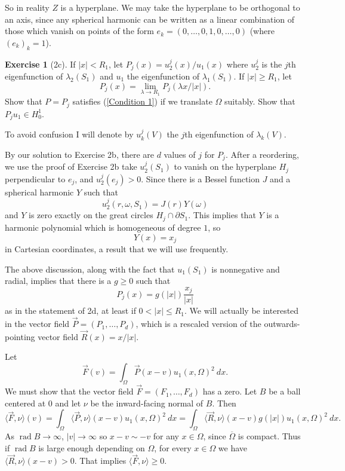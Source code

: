 \documentclass[10pt]{article}
\DeclareMathOperator{\rad}{rad}
\theoremstyle{definition}
\newtheorem{exer}{Exercise}
\begin{document}
So in reality $Z$ is a hyperplane.
We may take the hyperplane to be orthogonal to an axis, since any spherical harmonic can be written as a linear combination of those which vanish on points of the form $e_k = (0, \dots, 0, 1, 0, \dots, 0)$ (where $(e_k)_k = 1$).

\begin{exer}[2c]
If $|x| < R_1$, let $P_j(x) = u_2^j(x)/u_1(x)$ where $u_2^j$ is the $j$th eigenfunction of $\lambda_2(S_1)$ and $u_1$ the eigenfunction of $\lambda_1(S_1)$.
If $|x| \geq R_1$, let
$$P_j(x) = \lim_{\lambda \to R_1} P_j(\lambda x/|x|).$$
Show that $P = P_j$ satisfies (\ref{Condition 1}) if we translate $\Omega$ suitably. Show that $P_ju_1 \in H_0^1$.
\end{exer}

To avoid confusion I will denote by $u_k^j(V)$ the $j$th eigenfunction of $\lambda_k(V)$.

By our solution to Exercise 2b, there are $d$ values of $j$ for $P_j$.
After a reordering, we use the proof of Exercise 2b take $u_2^j(S_1)$ to vanish on the hyperplane $H_j$ perpendicular to $e_j$, and $u_2^j(e_j) > 0$.
Since there is a Bessel function $J$ and a spherical harmonic $Y$ such that
$$u_2^j(r, \omega, S_1) = J(r) Y(\omega)$$
and $Y$ is zero exactly on the great circles $H_j \cap \partial S_1$.
This implies that $Y$ is a harmonic polynomial which is homogeneous of degree $1$, so
$$Y(x) = x_j$$
in Cartesian coordinates,
a result that we will use frequently.

The above discussion, along with the fact that $u_1(S_1)$ is nonnegative and radial, implies that there is a $g \geq 0$ such that
$$P_j(x) = g(|x|) \frac{x_j}{|x|}$$
as in the statement of 2d, at least if $0 < |x| \leq R_1$.
We will actually be interested in the vector field $\vec P = (P_1, \dots, P_d)$, which is a rescaled version of the outwards-pointing vector field $\vec R(x) = x/|x|$.

Let
$$\vec F(v) = \int_\Omega \vec P(x - v) u_1(x, \Omega)^2 ~dx.$$
We must show that the vector field $\vec F = (F_1, \dots, F_d)$ has a zero.
Let $B$ be a ball centered at $0$ and let $\nu$ be the inward-facing normal of $B$.
Then
$$\langle \vec F, \nu\rangle(v) = \int_\Omega \langle \vec P, \nu\rangle(x - v) u_1(x, \Omega)^2 ~dx = \int_\Omega \langle \vec R, \nu\rangle (x - v) g(|x|) u_1(x, \Omega)^2 ~dx.$$
As $\rad B \to \infty$, $|v| \to \infty$ so $x - v \sim -v$ for any $x \in \Omega$, since $\overline \Omega$ is compact.
Thus if $\rad B$ is large enough depending on $\Omega$, for every $x \in \Omega$ we have $\langle \vec R, \nu\rangle(x - v) > 0$.
That implies $\langle \vec F, \nu\rangle \geq 0$.
\end{document}
